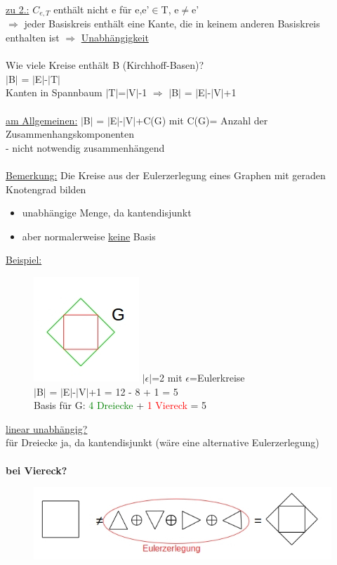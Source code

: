 \underline{zu 2.:} $C_{e,T}$ enthält nicht e für e,e'$\in$T, e$\neq$e'\\
$\Rightarrow$ jeder Basiskreis enthält eine Kante, die in keinem anderen Basiskreis enthalten ist $\Rightarrow$ \underline{Unabhängigkeit}
\\\\
Wie viele Kreise enthält B (Kirchhoff-Basen)?\\
$|$B$|$ = $|$E$|$-$|$T$|$\\
Kanten in Spannbaum $|$T$|$=$|$V$|$-1 $\Rightarrow$ $|$B$|$ = $|$E$|$-$|$V$|$+1
\\\\
\underline{am Allgemeinen:} $|$B$|$ = $|$E$|$-$|$V$|$+C(G) mit C(G)= Anzahl der Zusammenhangskomponenten\\
 - nicht notwendig zusammenhängend
\\\\
\underline{Bemerkung:} Die Kreise aus der Eulerzerlegung eines Graphen mit geraden Knotengrad bilden
\begin{itemize}
	\item unabhängige Menge, da kantendisjunkt
	\item aber normalerweise \underline{keine} Basis
\end{itemize}

\newpage
\underline{Beispiel:}
\begin{figure}[htp]
\centering
\includegraphics[scale=1.00]{lectures/161104/pix/pic7.jpg}
$| \epsilon |$=2 mit $\epsilon$=Eulerkreise\\
$|$B$|$ = $|$E$|$-$|$V$|$+1 = 12 - 8 + 1 = 5\\
Basis für G: \textcolor{green}{4 Dreiecke} + \textcolor{red}{1 Viereck} = 5
\end{figure}

\underline{linear unabhängig?}\\
für Dreiecke ja, da kantendisjunkt (wäre eine alternative Eulerzerlegung)
\\\\
\textbf{bei Viereck?}\\
\begin{figure}[htp]
\centering
\includegraphics[scale=1.00]{lectures/161104/pix/pic8.jpg}
\end{figure}

